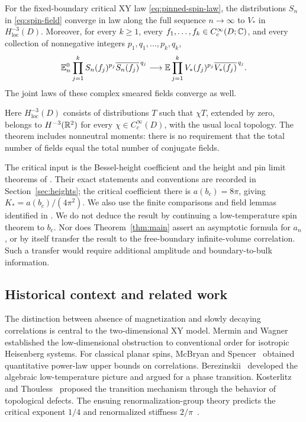 \begin{theorem}\label{thm:main}
For the fixed-boundary critical XY law \eqref{eq:pinned-spin-law},
the distributions \(S_n\) in \eqref{eq:spin-field} converge in law
along the full sequence \(n\to\infty\) to \(V_*\) in
\(H^{-3}_{\mathrm{loc}}(D)\).
Moreover, for every \(k\ge1\), every
\(f_1,\ldots,f_k\in C_c^\infty(D;\mathbb C)\), and every collection of
nonnegative integers \(p_1,q_1,\ldots,p_k,q_k\),
\begin{equation}\label{eq:main-moment-convergence}
 \mathbb E_n^0\prod_{j=1}^k
       S_n(f_j)^{p_j}\overline{S_n(f_j)}^{\,q_j}
 \longrightarrow
 \mathbb E\prod_{j=1}^k
       V_*(f_j)^{p_j}\overline{V_*(f_j)}^{\,q_j}.
\end{equation}
The joint laws of these complex smeared fields converge as well.
\end{theorem}

Here \(H^{-3}_{\mathrm{loc}}(D)\) consists of distributions \(T\)
such that \(\chi T\), extended by zero, belongs to
\(H^{-3}(\mathbb R^2)\) for every \(\chi\in C_c^\infty(D)\), with the
usual local topology. The theorem includes nonneutral moments:
there is no requirement that the total number of fields equal
the total number of conjugate fields.

The critical input is the Bessel-height coefficient and the height
and pin limit theorems of \cite{C}. Their exact statements and
conventions are recorded in Section~\ref{sec:heights}; the critical
coefficient there is \(a(b_c)=8\pi\), giving
\(K_*=a(b_c)/(4\pi^2)\). We also use the finite comparisons and field
lemmas identified in \cite{B}. We do not deduce the result by
continuing a low-temperature spin theorem to \(b_c\).
Nor does Theorem~\ref{thm:main} assert an asymptotic formula for
\(a_n\), or by itself transfer the result to the free-boundary
infinite-volume correlation. Such a transfer would require
additional amplitude and boundary-to-bulk information.

\subsection{Historical context and related work}

The distinction between absence of magnetization and slowly decaying
correlations is central to the two-dimensional XY model. Mermin and
Wagner~\cite{MW} established the low-dimensional obstruction to
conventional order for isotropic Heisenberg systems. For classical
planar spins, McBryan and Spencer~\cite{MS} obtained quantitative
power-law upper bounds on correlations. Berezinskii~\cite{Berezinskii}
developed the algebraic low-temperature picture and argued for a
phase transition. Kosterlitz and Thouless~\cite{BKT1973} proposed
the transition mechanism through the behavior of topological defects.
The ensuing renormalization-group theory predicts
the critical exponent \(1/4\) and renormalized stiffness
\(2/\pi\)~\cite{Kosterlitz1974,NK}.

